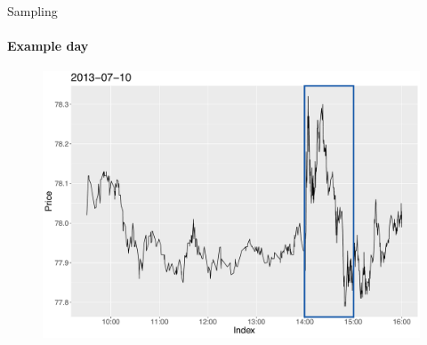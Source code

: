 \documentclass[usenames,dvipsnames]{beamer} %
\begin{document}
\begin{frame}{Sampling}
\framesubtitle{Example day}
\begin{figure}
	\includegraphics[scale=.35]{img/regularZoomBis}
\end{figure}
\end{frame}
\end{document}
